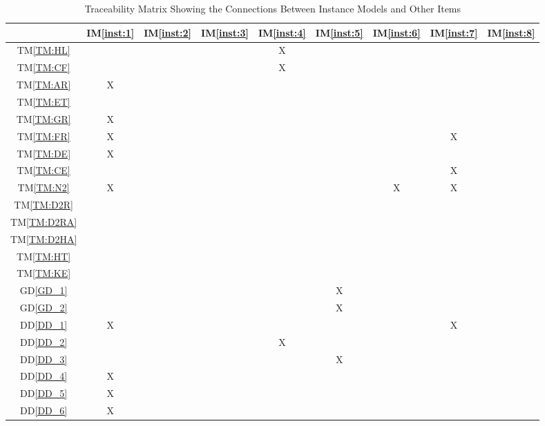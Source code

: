 \documentclass[12pt]{article}
\newcommand{\dref}[1]{GD\ref{#1}}
\newcommand{\ddref}[1]{DD\ref{#1}}
\newcommand{\tref}[1]{TM\ref{#1}}
\newcommand{\iref}[1]{IM\ref{#1}}
\begin{document}
\begin{table}[H]
\centering
\begin{tabular}{|c|c|c|c|c|c|c|c|c|}
\hline
	& \iref{inst:1} & \iref{inst:2}& \iref{inst:3} & \iref{inst:4} & \iref{inst:5} & \iref{inst:6}& \iref{inst:7}& \iref{inst:8}\\
\hline
\tref{TM:HL}        & & & &X& & & &  \\ \hline
\tref{TM:CF}        & & & &X& & & &  \\ \hline
\tref{TM:AR}        &X& & & & & & &  \\ \hline
\tref{TM:ET}        & & & & & & & &  \\ \hline
\tref{TM:GR}        &X& & & & & & &  \\ \hline
\tref{TM:FR}        &X& & & & & &X&  \\ \hline
\tref{TM:DE}        &X& & & & & & &  \\ \hline
\tref{TM:CE}        & & & & & & &X&  \\ \hline
\tref{TM:N2}        &X& & & & &X&X&  \\ \hline
\tref{TM:D2R}       & & & & & & & &  \\ \hline
\tref{TM:D2RA}      & & & & & & & &  \\ \hline
\tref{TM:D2HA}      & & & & & & & &  \\ \hline
\tref{TM:HT}        & & & & & & & &  \\ \hline
\tref{TM:KE}        & & & & & & & &  \\ \hline
\dref{GD_1}         & & & & &X& & &  \\ \hline
\dref{GD_2}         & & & & &X& & &  \\ \hline
\ddref{DD_1}        &X& & & & & &X&  \\ \hline
\ddref{DD_2}        & & & &X& & & &  \\ \hline
\ddref{DD_3}        & & & & &X& & &  \\ \hline
\ddref{DD_4}        &X& & & & & & &  \\ \hline
\ddref{DD_5}        &X& & & & & & &  \\ \hline
\ddref{DD_6}        &X& & & & & & &  \\ \hline
\end{tabular}
\caption{Traceability Matrix Showing the Connections Between Instance Models and Other Items}
\label{Table:trace_IM_Others}
\end{table}
\end{document}
